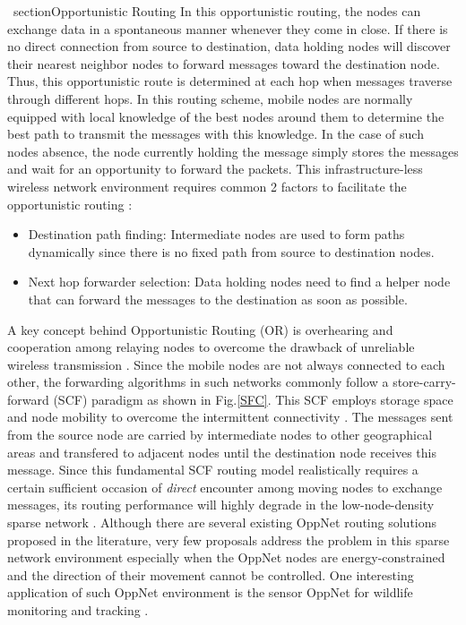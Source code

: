 
\ section{Opportunistic Routing}
\label{bg:Opportunistic Networks:Opportunistic Routing}
In this opportunistic routing, the nodes can exchange data in a spontaneous manner whenever they come in close.
%
If there is no direct connection from source to destination, data holding nodes will discover their nearest neighbor nodes to forward messages toward the destination node.
%
Thus, this opportunistic route is determined at each hop when messages traverse through different hops.
%
In this routing scheme, mobile nodes are normally equipped with local knowledge of the best nodes around them to determine the best path to transmit the messages with this knowledge.
%
In the case of such nodes absence, the node currently holding the message simply stores the messages and wait for an opportunity to forward the packets.
This  infrastructure-less wireless network environment requires common 2 factors to facilitate the opportunistic routing \cite{Poonguzharselvi2013a} :

\begin{itemize}
	\item Destination path finding:
	Intermediate nodes are used to form paths dynamically since there is no fixed path from source to destination nodes.
	\item Next hop forwarder selection:
	Data holding nodes need to find a helper node that can forward the messages to the destination as soon as possible.
\end{itemize}
A key concept behind Opportunistic Routing (OR) is overhearing and cooperation among relaying nodes to overcome the drawback of unreliable wireless transmission \cite{Liu2009}.
Since the mobile nodes are not always connected to each other, the forwarding algorithms in such networks commonly follow a store-carry-forward (SCF) paradigm as shown in Fig.\ref{SFC}.
This SCF employs storage space and node mobility to overcome the intermittent connectivity \cite{Ma2011}.
The messages sent from the source node are carried by intermediate nodes to other geographical areas and transfered to adjacent nodes until the destination node receives this message.
Since this fundamental SCF routing model realistically requires a certain sufficient occasion of \emph{direct} encounter among moving nodes to exchange messages, its routing performance will highly degrade in the low-node-density sparse network \cite{Spyropoulos2010}.
Although there are several existing OppNet routing solutions \cite{ Zhang2013, Chung-Ming2008, Spyropoulos2004, Grossglauser2002, Vahdat2000,Kerdsri2013} proposed in the literature, very few proposals address the problem in this sparse network environment especially when the OppNet nodes are energy-constrained \cite{Liguang2013,Eu2010} and the direction of their movement cannot be controlled.
One interesting application of such OppNet environment is the sensor OppNet for wildlife monitoring and tracking \cite{zebranet2004, Small2003}.

